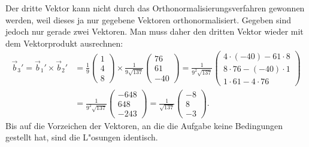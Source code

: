 \begin{loesung}
\[\]
Der dritte Vektor kann nicht durch das Orthonormalisierungsverfahren
gewonnen werden, weil dieses ja nur gegebene Vektoren orthonormalisiert.
Gegeben sind jedoch nur gerade zwei Vektoren. Man muss daher den dritten
Vektor wieder mit dem Vektorprodukt ausrechnen:
\begin{align*}
\vec b_3'
=
\vec b_1'\times\vec b_2'
&=
\frac19
\begin{pmatrix}
1\\4\\8
\end{pmatrix}
\times
\frac1{9\sqrt{137}}\begin{pmatrix}
76\\
61\\
-40
\end{pmatrix}
=
\frac1{9^2\sqrt{137}}
\begin{pmatrix}
4\cdot (-40)-61\cdot 8\\
8\cdot 76-(-40)\cdot 1\\
1\cdot 61-4\cdot 76
\end{pmatrix}
\\
&=
\frac1{9^2\sqrt{137}}
\begin{pmatrix}
-648\\
648\\
-243
\end{pmatrix}
=
\frac1{\sqrt{137}}
\begin{pmatrix}
-8\\
8\\
-3
\end{pmatrix}.
\end{align*}
Bis auf die Vorzeichen der Vektoren, an die die Aufgabe keine Bedingungen
gestellt hat, sind die L"osungen identisch.
\end{loesung}
